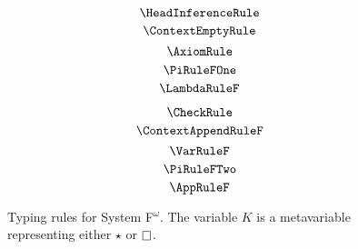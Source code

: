 
\begin{figure}
    \centering
    \begin{minipage}{0.5\textwidth}
        $$\HeadInferenceRule$$
        $$\ContextEmptyRule$$
        $$\AxiomRule$$
        $$\PiRuleFOne$$
        $$\LambdaRuleF$$
    \end{minipage}%
    \begin{minipage}{0.5\textwidth}
        $$\CheckRule$$
        $$\ContextAppendRuleF$$
        $$\VarRuleF$$
        $$\PiRuleFTwo$$
        $$\AppRuleF$$
    \end{minipage}%
    \caption{
        Typing rules for System F$^\omega$. The variable $K$ is a metavariable representing either $\star$ or $\kind$.
    }
    \label{fig:typing_f}
\end{figure}
